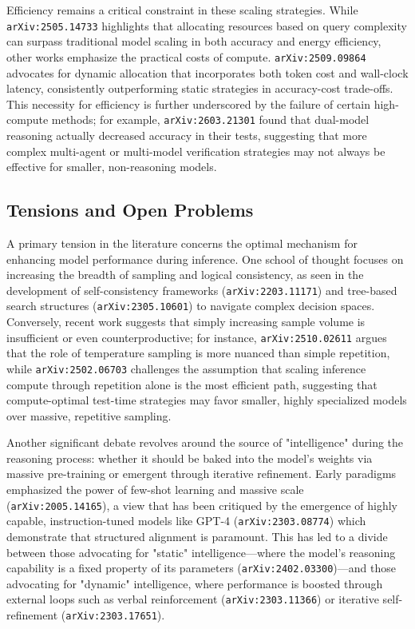 \documentclass[11pt]{article}
\begin{document}
Efficiency remains a critical constraint in these scaling strategies. While \texttt{arXiv:2505.14733} highlights that allocating resources based on query complexity can surpass traditional model scaling in both accuracy and energy efficiency, other works emphasize the practical costs of compute. \texttt{arXiv:2509.09864} advocates for dynamic allocation that incorporates both token cost and wall-clock latency, consistently outperforming static strategies in accuracy-cost trade-offs. This necessity for efficiency is further underscored by the failure of certain high-compute methods; for example, \texttt{arXiv:2603.21301} found that dual-model reasoning actually decreased accuracy in their tests, suggesting that more complex multi-agent or multi-model verification strategies may not always be effective for smaller, non-reasoning models.

\subsection{Tensions and Open Problems}

A primary tension in the literature concerns the optimal mechanism for enhancing model performance during inference. One school of thought focuses on increasing the breadth of sampling and logical consistency, as seen in the development of self-consistency frameworks (\texttt{arXiv:2203.11171}) and tree-based search structures (\texttt{arXiv:2305.10601}) to navigate complex decision spaces. Conversely, recent work suggests that simply increasing sample volume is insufficient or even counterproductive; for instance, \texttt{arXiv:2510.02611} argues that the role of temperature sampling is more nuanced than simple repetition, while \texttt{arXiv:2502.06703} challenges the assumption that scaling inference compute through repetition alone is the most efficient path, suggesting that compute-optimal test-time strategies may favor smaller, highly specialized models over massive, repetitive sampling.

Another significant debate revolves around the source of "intelligence" during the reasoning process: whether it should be baked into the model's weights via massive pre-training or emergent through iterative refinement. Early paradigms emphasized the power of few-shot learning and massive scale (\texttt{arXiv:2005.14165}), a view that has been critiqued by the emergence of highly capable, instruction-tuned models like GPT-4 (\texttt{arXiv:2303.08774}) which demonstrate that structured alignment is paramount. This has led to a divide between those advocating for "static" intelligence—where the model's reasoning capability is a fixed property of its parameters (\texttt{arXiv:2402.03300})—and those advocating for "dynamic" intelligence, where performance is boosted through external loops such as verbal reinforcement (\texttt{arXiv:2303.11366}) or iterative self-refinement (\texttt{arXiv:2303.17651}).
\end{document}

